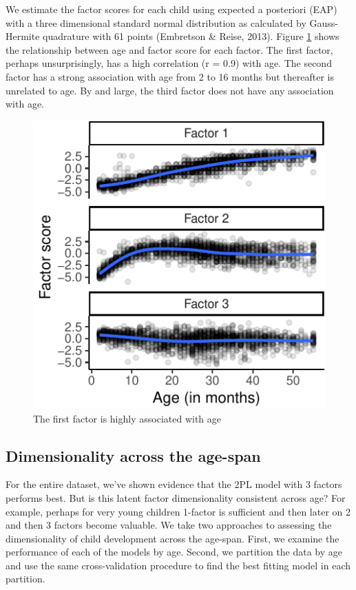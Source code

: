 \documentclass[10pt, letterpaper]{article}
\newenvironment{CodeChunk}{}{}
\begin{document}
We estimate the factor scores for each child using expected a posteriori
(EAP) with a three dimensional standard normal distribution as
calculated by Gauss-Hermite quadrature with 61 points (Embretson \&
Reise, 2013). Figure \ref{fig:factorscores} shows the relationship
between age and factor score for each factor. The first factor, perhaps
unsurprisingly, has a high correlation (r = 0.9) with age. The second
factor has a strong association with age from 2 to 16 months but
thereafter is unrelated to age. By and large, the third factor does not
have any association with age.

\begin{CodeChunk}
\begin{figure}[tb]
\includegraphics{figs/factorscores-1} \caption[The first factor is highly associated with age]{The first factor is highly associated with age}\label{fig:factorscores}
\end{figure}
\end{CodeChunk}

\hypertarget{dimensionality-across-the-age-span}{%
\subsection{Dimensionality across the
age-span}\label{dimensionality-across-the-age-span}}

For the entire dataset, we've shown evidence that the 2PL model with 3
factors performs best. But is this latent factor dimensionality
consistent across age? For example, perhaps for very young children
1-factor is sufficient and then later on 2 and then 3 factors become
valuable. We take two approaches to assessing the dimensionality of
child development across the age-span. First, we examine the performance
of each of the models by age. Second, we partition the data by age and
use the same cross-validation procedure to find the best fitting model
in each partition.
\end{document}
